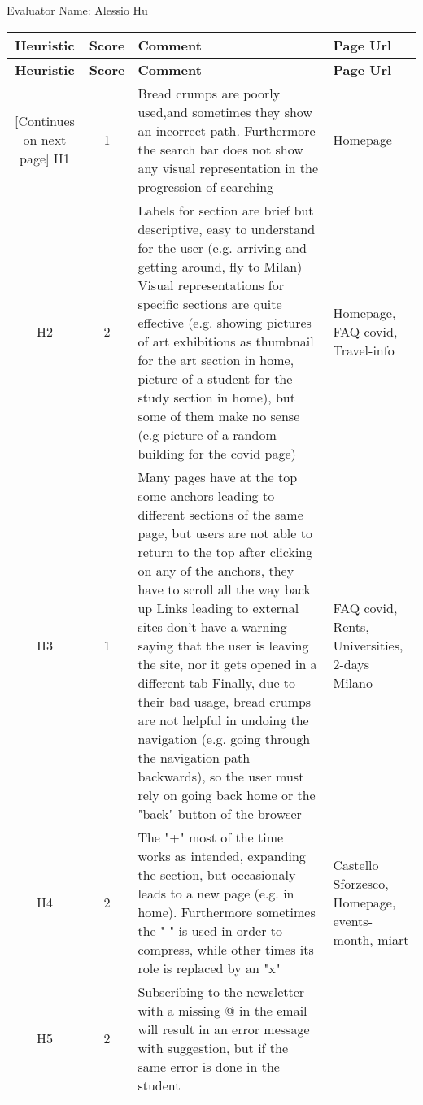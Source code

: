 Evaluator Name: Alessio Hu
\begin{tabularx}{\linewidth}{c c X p{3cm}}
    \textbf{Heuristic} & \textbf{Score} & \textbf{Comment} & \textbf{Page Url}
    \\ \midrule
    \endfirsthead
    \toprule
    \textbf{Heuristic} & \textbf{Score} & \textbf{Comment} & \textbf{Page Url}
    \\ \midrule
    \endhead
    \midrule
    \footnotesize [Continues on next page]
    \endfoot
    \bottomrule
    \endlastfoot
    H1 & 1 & Bread crumps are poorly used,and sometimes they show an incorrect path. Furthermore the search bar does not show any visual representation in the progression of searching & Homepage\\ \midrule
    H2 & 2 & Labels for section are brief but
    descriptive, easy to understand
    for the user (e.g. arriving and
    getting around, fly to Milan)
    Visual representations for specific
    sections are quite effective (e.g.
    showing pictures of art exhibitions
    as thumbnail for the art section in
    home, picture of a student for
    the study section in home), but
    some of them make no sense
    (e.g picture of a random
    building for the covid page) & Homepage, FAQ covid, Travel-info \\ \midrule
    H3 & 1 & Many pages have at the top
    some anchors leading to different
    sections of the same page,
    but users are not able to return to
    the top after clicking on any of the
    anchors, they have to scroll
    all the way back up
    Links leading to external sites
    don't have a warning saying that the
    user is leaving the site, nor it gets
    opened in a different tab
    Finally, due to their bad usage, bread
    crumps are not helpful in undoing the
    navigation (e.g. going through the
    navigation path backwards), so the user
    must rely on going back home or the
    "back" button of the browser & FAQ covid, Rents, Universities, 2-days Milano\\ \midrule
    H4 & 2 & The "+" most of the time works as intended,
    expanding the section, but
    occasionaly leads to a new page
    (e.g. in home). Furthermore sometimes
    the "-" is used in order to compress,
    while other times its role is replaced by
    an "x" & Castello Sforzesco, Homepage, events-month, miart\\ \midrule
    H5 & 2 & Subscribing
    to the newsletter with a
    missing @ in the email will result
    in an error message with suggestion,
    but if the same error is done in the student

\end{tabularx}

